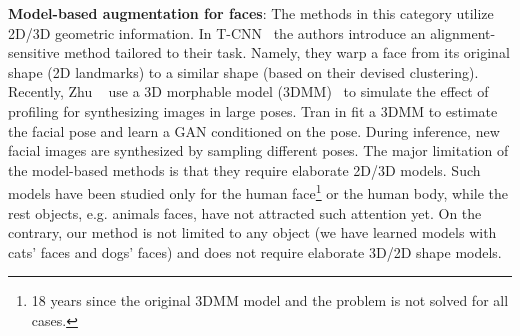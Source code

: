 \documentclass[10pt,twocolumn,letterpaper]{article}
\begin{document}
\label{sec:linear_dynamics_related_work}\textbf{Model-based augmentation for faces}: The methods in this category utilize 2D/3D geometric information. In T-CNN~\cite{wu2015facial} the authors introduce an alignment-sensitive method tailored to their task. Namely, they warp a face from its original shape (2D landmarks) to a similar shape (based on their devised clustering).  Recently, Zhu \etal~\cite{zhu2016face} use a 3D morphable model (3DMM)~\cite{blanz1999morphable} to simulate the effect of profiling for synthesizing images in large poses. Tran \etal in \cite{tran2017disentangled} fit a 3DMM to estimate the facial pose and learn a GAN conditioned on the pose. During inference, new facial images are synthesized by sampling different poses. The major limitation of the model-based methods is that they require elaborate 2D/3D models. Such models have been studied only for the human face\footnote{18 years since the original 3DMM model and the problem is not solved for all cases.} or the human body, while the rest objects, e.g. animals faces, have not attracted such attention yet. On the contrary, our method is not limited to any object (we have learned models with cats' faces and dogs' faces) and does not require elaborate 3D/2D shape models.
\end{document}
